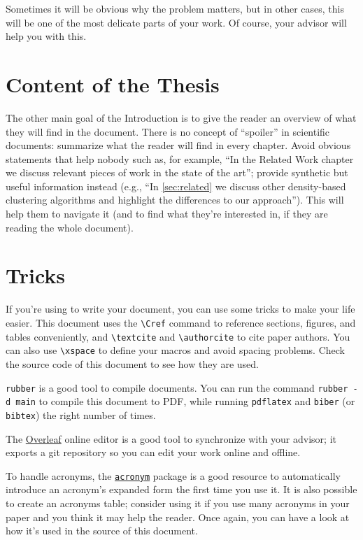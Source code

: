 Sometimes it will be obvious why the problem matters, but in other cases, this will be
one of the most delicate parts of your work. Of course, your advisor will help you with this.

\section{Content of the Thesis}

The other main goal of the Introduction is to give the reader an overview of what they will
find in the document. There is no concept of ``spoiler'' in scientific documents: summarize
what the reader will find in every chapter. Avoid obvious statements that help nobody such as, for example, ``In the Related Work chapter we discuss relevant pieces of work in the state of the art''; provide synthetic but useful information instead (e.g., ``In \cref{sec:related} we discuss other density-based clustering algorithms and highlight the differences to our approach''). This will help them to navigate it (and to find what they're interested in, if they are reading the whole document).

\section{\latex Tricks}

If you're using \latex to write your document, you can use some tricks to make your life
easier. This document uses the \verb|\Cref| command to reference sections, figures, and tables conveniently, and \verb|\textcite| and
\verb|\authorcite| to cite paper authors. You can also use \verb|\xspace| to define your macros
and avoid spacing problems. Check the source code of this document to see how they are used.

\texttt{rubber} is a good tool to compile \latex documents. You can run the command
\texttt{rubber -d main} to compile this document to PDF, while running \texttt{pdflatex}
and \texttt{biber} (or \texttt{bibtex}) the right number of times.

The \href{https://www.overleaf.com}{Overleaf} online editor is a good tool to synchronize with
your advisor; it exports a git repository so you can edit your work online and offline.

To handle acronyms, the \href{https://ctan.org/pkg/acronym}{\texttt{acronym}} package is a good resource to automatically introduce an acronym's expanded form the first time you use it. It is also possible to create an acronyms table; consider using it if you use many acronyms in your paper and you think it may help the reader. Once again, you can have a look at how it's used in the source of this document.

